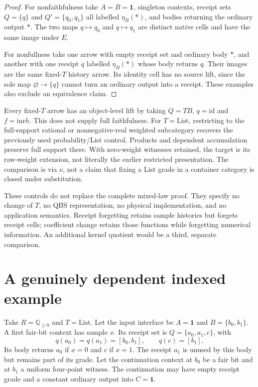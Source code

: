 \documentclass[11pt,a4paper]{article}
\theoremstyle{definition}
\newcommand{\id}{\mathrm{id}}
\newcommand{\one}{\mathbf 1}
\newcommand{\List}{\mathrm{List}}
\newcommand{\inr}{\mathrm{inr}}
\begin{document}
\begin{proof}
For nonfaithfulness take $A=B=\one$, singleton contexts, receipt sets
$Q=\{q\}$ and $Q'=\{q_0,q_1\}$ all labelled $\eta_B(*)$, and bodies
returning the ordinary output $*$. The two maps $q\mapsto q_0$ and
$q\mapsto q_1$ are distinct native cells and have the same image under $E$.

For nonfullness take one arrow with empty receipt set and ordinary body
$*$, and another with one receipt $q$ labelled $\eta_B(*)$ whose body
returns $q$. Their images are the same fixed-$T$ history arrow. Its identity
cell has no source lift, since the sole map $\varnothing\to\{q\}$ cannot
turn an ordinary output into a receipt. These examples also exclude an
equivalence claim.
\end{proof}

Every fixed-$T$ arrow has an object-level lift by taking $Q=TB$, $q=\id$
and $f=\inr h$. This does not supply full faithfulness. For $T=\mathrm{List}$,
restricting to the full-support rational or nonnegative-real weighted
subcategory recovers the previously used probability/List control.
Products and dependent accumulation preserve full support there. With
zero-weight witnesses retained, the target is its raw-weight extension,
not literally the earlier restricted presentation. The comparison is via
$\nu$, not a claim that fixing a List grade in a container category is
closed under substitution.

These controls do not replace the complete mixed-law proof. They specify
no change of $T$, no QBS representation, no physical implementation, and
no application semantics. Receipt forgetting retains sample histories but
forgets receipt cells; coefficient change retains those functions while
forgetting numerical information. An additional kernel quotient would be a
third, separate comparison.

\section{A genuinely dependent indexed example}\label{ex:indexed}

Take $R=\mathbb Q_{\ge0}$ and $T=\List$. Let the input interface be
$A=\one$ and $B=\{b_0,b_1\}$. A first fair-bit context has sample $x$.
Its receipt set is $Q=\{a_0,a_1,c\}$, with
\[
 q(a_0)=q(a_1)=[b_0,b_1],\qquad q(c)=[b_1].
\]
Its body returns $a_0$ if $x=0$ and $c$ if $x=1$. The receipt $a_1$ is
unused by this body but remains part of its grade. Let the continuation
context at $b_0$ be a fair bit and at $b_1$ a uniform four-point witness.
The continuation may have empty receipt grade and a constant ordinary
output into $C=\one$.
\end{document}
